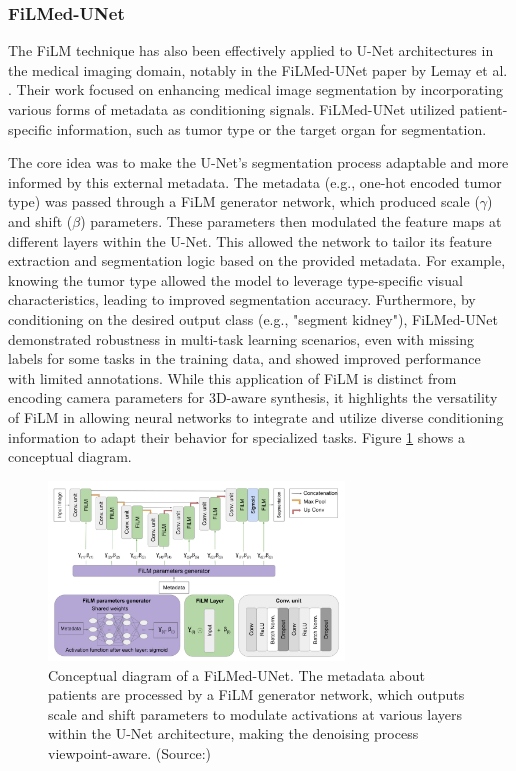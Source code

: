 \subsubsection{FiLMed-UNet}
The FiLM technique has also been effectively applied to U-Net architectures in the medical imaging domain, notably in the FiLMed-UNet paper by Lemay et al. \cite{filmedunet}. Their work focused on enhancing medical image segmentation by incorporating various forms of metadata as conditioning signals. FiLMed-UNet utilized patient-specific information, such as tumor type or the target organ for segmentation.

The core idea was to make the U-Net's segmentation process adaptable and more informed by this external metadata. The metadata (e.g., one-hot encoded tumor type) was passed through a FiLM generator network, which produced scale ($\gamma$) and shift ($\beta$) parameters. These parameters then modulated the feature maps at different layers within the U-Net. This allowed the network to tailor its feature extraction and segmentation logic based on the provided metadata. For example, knowing the tumor type allowed the model to leverage type-specific visual characteristics, leading to improved segmentation accuracy. Furthermore, by conditioning on the desired output class (e.g., "segment kidney"), FiLMed-UNet demonstrated robustness in multi-task learning scenarios, even with missing labels for some tasks in the training data, and showed improved performance with limited annotations. While this application of FiLM is distinct from encoding camera parameters for 3D-aware synthesis, it highlights the versatility of FiLM in allowing neural networks to integrate and utilize diverse conditioning information to adapt their behavior for specialized tasks. Figure \ref{fig:filmed-unet-concept} shows a conceptual diagram.

\begin{figure}[h]
  \centering
  \includegraphics[width=0.7\textwidth]{images/related-work/filmed-unet.png}
  \caption{Conceptual diagram of a FiLMed-UNet. The metadata about patients are processed by a FiLM generator network, which outputs scale and shift parameters to modulate activations at various layers within the U-Net architecture, making the denoising process viewpoint-aware. (Source:\cite{filmed_unet})}
  \label{fig:filmed-unet-concept}

\end{figure}

